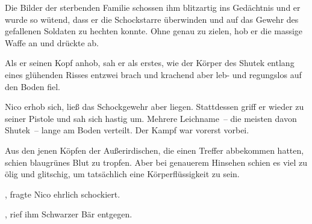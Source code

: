 \par

Die Bilder der sterbenden Familie schossen ihm blitzartig ins Gedächtnis und er wurde so wütend, dass er die Schockstarre überwinden und auf das Gewehr des gefallenen Soldaten zu hechten konnte. Ohne genau zu zielen, hob er die massige Waffe an und drückte ab.

\par

Als er seinen Kopf anhob, sah er als erstes, wie der Körper des Shutek entlang eines glühenden Risses entzwei brach und krachend aber leb- und regungslos auf den Boden fiel.

\par

Nico erhob sich, ließ das Schockgewehr aber liegen. Stattdessen griff er wieder zu seiner Pistole und sah sich hastig um. Mehrere Leichname~-- die meisten davon Shutek~-- lange am Boden verteilt. Der Kampf war vorerst vorbei.

\par

Aus den jenen Köpfen der Außerirdischen, die einen Treffer abbekommen hatten, schien blaugrünes Blut zu tropfen. Aber bei genauerem Hinsehen schien es viel zu ölig und glitschig, um tatsächlich eine Körperflüssigkeit zu sein.

\par

, fragte Nico ehrlich schockiert. 

\par

, rief ihm Schwarzer Bär entgegen. 